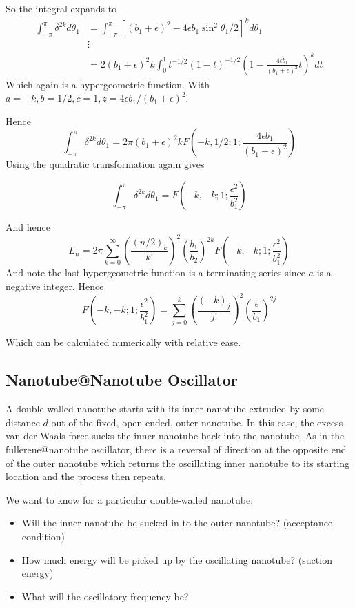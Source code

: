 \documentclass{E:/Documents/Latex/myassignment}
\begin{document}
So the integral expands to
\begin{align*}
	\int_{-\pi}^{\pi}\delta^{2k} d\theta_1 &= \int_{-\pi}^{\pi} \left[(b_1 + \epsilon)^2 - 4 \epsilon b_1 \sin^2 \theta_1/2\right]^k d\theta_1\\
	&\vdots\\
	&= 2(b_1 + \epsilon)^2k \int_0^1 t^{-1/2}(1-t)^{-1/2} \left(1- \frac{4 \epsilon b_1}{(b_1 + \epsilon)^2} t\right)^k dt
\end{align*}
Which again is a hypergeometric function. With $a=-k, b=1/2, c=1, z = 4 \epsilon b_1/(b_1 + \epsilon)^2$.

Hence
\[\int_{-\pi}^{\pi}\delta^{2k} d\theta_1  = 2\pi (b_1+\epsilon)^2k F(-k,1/2;1; \frac{4 \epsilon b_1}{(b_1+ \epsilon)^2})\]
Using the quadratic transformation again gives

\[\int_{-\pi}^{\pi}\delta^{2k} d\theta_1  = F(-k,-k;1; \frac{\epsilon^2}{b_1^2})\]

And hence
\[L_n = 2\pi \sum_{k=0}^{\infty} \left(\frac{(n/2)_k}{k!}\right)^2 \left(\frac{b_1}{b_2}\right)^{2k} F(-k,-k;1; \frac{\epsilon^2}{b_1^2})\]
And note the last hypergeometric function is a terminating series since $a$ is a negative integer. Hence
\[F\left(-k,-k;1;\frac{\epsilon^2}{b_1^2}\right) = \sum_{j=0}^k \left(\frac{(-k)_j}{j!}\right)^2 \left(\frac{\epsilon}{b_1}\right)^{2j}\]

Which can be calculated numerically with relative ease.

\subsection{Nanotube@Nanotube Oscillator}

A double walled nanotube starts with its inner nanotube extruded by some distance $d$ out of the fixed, open-ended, outer nanotube. In this case, the excess van der Waals force sucks the inner nanotube back into the nanotube. As in the fullerene@nanotube oscillator, there is a reversal of direction at the opposite end of the outer nanotube which returns the oscillating inner nanotube to its starting location and the process then repeats.

We want to know for a particular double-walled nanotube:
\begin{itemize}
	\item Will the inner nanotube be sucked in to the outer nanotube? (acceptance condition)
	\item How much energy will be picked up by the oscillating nanotube? (suction energy)
	\item What will the oscillatory frequency be?
\end{itemize}
\end{document}

